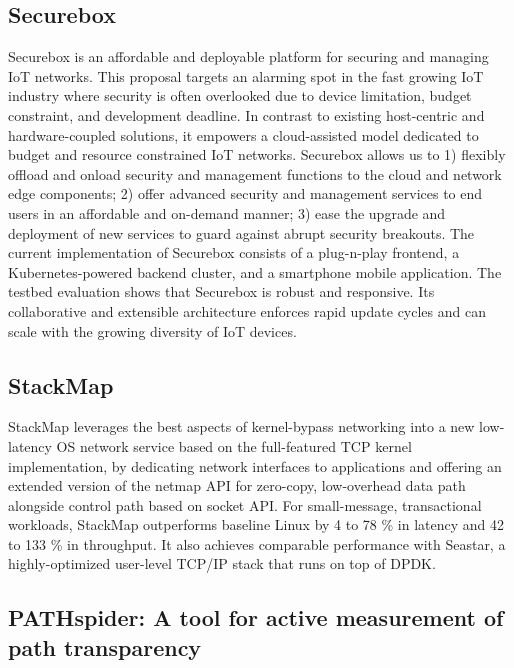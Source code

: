 \subsection{Securebox}

Securebox is an affordable and deployable platform for 
securing and managing IoT networks. This proposal 
targets an alarming spot in the fast growing IoT industry where 
security is often overlooked due to device limitation, budget 
constraint, and development deadline. In contrast to existing 
host-centric and hardware-coupled solutions, it empowers 
a cloud-assisted model dedicated to budget and resource 
constrained IoT networks. Securebox allows us to 
1) flexibly offload and onload security and management functions to the cloud and network edge components; 2) offer advanced security and management 
services to end users in an affordable and on-demand manner; 
3) ease the upgrade and deployment of new services to guard 
against abrupt security breakouts. The current 
implementation of Securebox consists of a plug-n-play 
frontend, a Kubernetes-powered backend cluster, and a smartphone 
mobile application. The testbed evaluation shows that 
Securebox is robust and responsive. Its collaborative and 
extensible architecture enforces rapid update cycles and can 
scale with the growing diversity of IoT devices.

\subsection{StackMap}

StackMap leverages the best aspects of kernel-bypass networking 
into a new low-latency OS network service based on the 
full-featured TCP kernel implementation, by dedicating network 
interfaces to applications and offering an extended version of 
the netmap API for zero-copy, low-overhead data path alongside 
control path based on socket API. For small-message, 
transactional workloads, StackMap outperforms baseline Linux 
by 4 to 78 \% in latency and 42 to 133 \% in throughput. 
It also achieves comparable performance with Seastar, 
a highly-optimized user-level TCP/IP stack that runs on top of DPDK.

\subsection{PATHspider: A tool for active measurement of path transparency}

